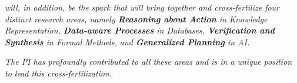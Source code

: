 
\begin{framed}{\it
 \project will, in addition, be the spark that will bring together and cross-fertilize four distinct research areas, namely \textbf{Reasoning about Action} in \emph{Knowledge Representation}, 
\textbf{Data-aware Processes} in \emph{Databases}, \textbf{Verification and Synthesis} in \emph{Formal Methods},  and \textbf{Generalized Planning} in \emph{AI}.}
\end{framed}

\emph{The PI has profoundly contributed to all these areas and is in a unique position to lead this cross-fertilization.}

